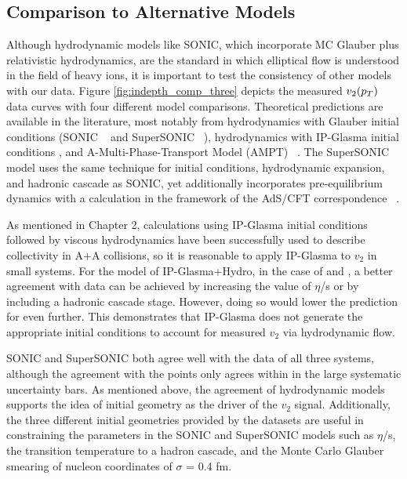 \subsection{Comparison to Alternative Models}
Although hydrodynamic models like SONIC, which incorporate MC Glauber plus relativistic hydrodynamics, are the standard in which elliptical flow is understood in the field of heavy ions, it is important to test the consistency of other models with our data. Figure \ref{fig:indepth_comp_three} depicts the measured $v_2(\mbox{$p_T$})$ data curves with four different model comparisons. Theoretical predictions are available in the literature, most notably from hydrodynamics with Glauber initial conditions (SONIC ~\cite{Habich2015} and SuperSONIC ~\cite{Romatschke2015}), hydrodynamics with IP-Glasma initial conditions \cite{Schenke20141039}, and A-Multi-Phase-Transport Model (AMPT) ~\cite{PhysRevC.72.064901}. The SuperSONIC model uses the same technique for initial conditions, hydrodynamic expansion, and hadronic cascade as SONIC, yet additionally incorporates pre-equilibrium dynamics with a calculation in the framework of the AdS/CFT correspondence ~\cite{PhysRevLett.111.222302}.

As mentioned in Chapter 2, calculations using IP-Glasma initial conditions followed by viscous hydrodynamics have been successfully used to describe collectivity in A+A collisions, so it is reasonable to apply IP-Glasma to $v_2$ in small systems. For the model of IP-Glasma+Hydro, in the case of \dau and \hau, a better agreement with data can be achieved by increasing the value of $\eta$/s or by including a hadronic cascade stage. However, doing so would lower the prediction for \pau even further. This demonstrates that IP-Glasma does not generate the appropriate initial conditions to account for measured $v_2$ via hydrodynamic flow.

SONIC and SuperSONIC both agree well with the data of all three systems, although the agreement with the \pau points only agrees within in the large systematic uncertainty bars. As mentioned above, the agreement of hydrodynamic models supports the idea of initial geometry as the driver of the $v_2$ signal. Additionally, the three different initial geometries provided by the datasets are useful in constraining the parameters in the SONIC and SuperSONIC models such as $\eta$/s, the transition temperature to a hadron cascade, and the Monte Carlo Glauber smearing of nucleon coordinates of $\sigma$ = 0.4 fm.

